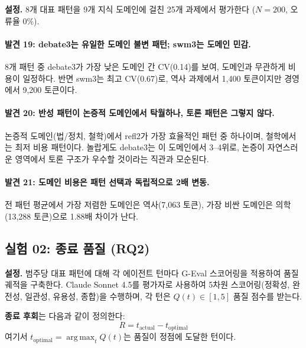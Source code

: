 \documentclass[a4paper,11pt]{article}
\DeclareMathOperator*{\argmax}{arg\,max}
\begin{document}
\textbf{설정.} 8개 대표 패턴을 9개 지식 도메인에 걸친 25개 과제에서 평가한다 ($N=200$, 오류율 0\%).



\paragraph{발견 19: debate3는 유일한 도메인 불변 패턴; swm3는 도메인 민감.}
8개 패턴 중 debate3가 가장 낮은 도메인 간 CV(0.14)를 보여, 도메인과 무관하게 비용이 일정하다. 반면 swm3는 최고 CV(0.67)로, 역사 과제에서 1,400 토큰이지만 경영에서 9,200 토큰이다.

\paragraph{발견 20: 반성 패턴이 논증적 도메인에서 탁월하나, 토론 패턴은 그렇지 않다.}
논증적 도메인(법/정치, 철학)에서 refl2가 가장 효율적인 패턴 중 하나이며, 철학에서는 최저 비용 패턴이다. 놀랍게도 debate3는 이 도메인에서 3--4위로, 논증이 자연스러운 영역에서 토론 구조가 우수할 것이라는 직관과 모순된다.

\paragraph{발견 21: 도메인 비용은 패턴 선택과 독립적으로 2배 변동.}
전 패턴 평균에서 가장 저렴한 도메인은 역사(7,063 토큰), 가장 비싼 도메인은 의학(13,288 토큰)으로 1.88배 차이가 난다.

\subsection{실험 02: 종료 품질 (RQ2)}
\label{sec:exp02}

\textbf{설정.} 범주당 대표 패턴에 대해 각 에이전트 턴마다 G-Eval 스코어링을 적용하여 품질 궤적을 구축한다. Claude Sonnet 4.5를 평가자로 사용하여 5차원 스코어링(정확성, 완전성, 일관성, 유용성, 종합)을 수행하며, 각 턴은 $Q(t) \in [1, 5]$ 품질 점수를 받는다.

\textbf{종료 후회}는 다음과 같이 정의한다:
\begin{equation}
R = t_{\text{actual}} - t_{\text{optimal}}
\end{equation}
여기서 $t_{\text{optimal}} = \argmax_t Q(t)$는 품질이 정점에 도달한 턴이다.
\end{document}
